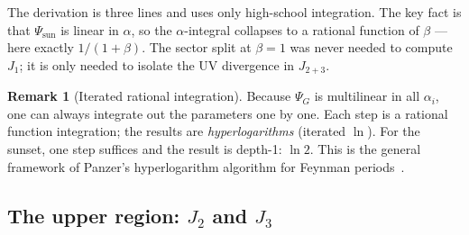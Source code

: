\documentclass[10pt,a4paper,twocolumn]{article}
\theoremstyle{plain}
\theoremstyle{definition}
\newtheorem{remark}{Remark}
\renewcommand{\Psi}{\varPsi}
\begin{document}
\noindent
The derivation is three lines and uses only high-school integration.
The key fact is that $\Psi_{\text{sun}}$ is linear in $\alpha$,
so the $\alpha$-integral collapses to a rational function of $\beta$
--- here exactly $1/(1+\beta)$.  The sector split at $\beta=1$
was never needed to compute $J_1$; it is only needed to isolate
the UV divergence in $J_{2+3}$.

\begin{remark}[Iterated rational integration]
Because $\Psi_G$ is multilinear in all $\alpha_i$, one can always
integrate out the parameters one by one.  Each step is a rational
function integration; the results are \emph{hyperlogarithms}
(iterated $\ln$).  For the sunset, one step suffices and the
result is depth-1: $\ln 2$.  This is the general framework of
Panzer's hyperlogarithm algorithm for Feynman periods~\citep{Panzer2015}.
\end{remark}

\subsection{The upper region: $J_2$ and $J_3$}
\end{document}

